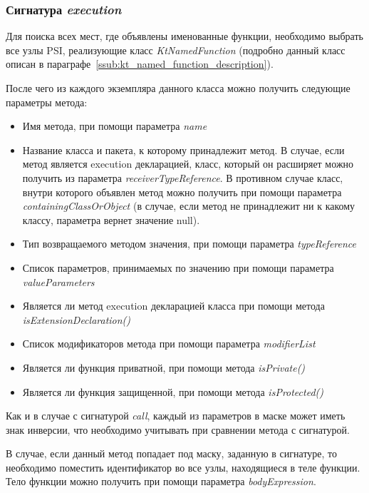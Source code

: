 \subsubsection{Сигнатура \textit{execution}}
\label{ssub:execution_signature}
Для поиска всех мест, где объявлены именованные функции, необходимо выбрать все
узлы PSI, реализующие класс \textit{KtNamedFunction} (подробно данный класс
описан в параграфе~\ref{ssub:kt_named_function_description}).

После чего из каждого экземпляра данного класса можно получить следующие параметры метода:
\begin{itemize}
	\item Имя метода, при помощи параметра \textit{name}
	\item Название класса и пакета, к которому принадлежит метод.
				В случае, если метод является execution декларацией, класс, который он
				расширяет можно получить из параметра \textit{receiverTypeReference}.
				В противном случае класс, внутри которого объявлен метод можно получить
				при	помощи параметра \textit{containingClassOrObject} (в случае, если
				метод не принадлежит ни к какому классу, параметра вернет значение null).
	\item Тип возвращаемого методом значения, при помощи параметра
				\textit{typeReference}
	\item Список параметров, принимаемых по значению при помощи параметра
				\textit{valueParameters}
	\item Является ли метод execution декларацией класса при помощи метода
				\textit{isExtensionDeclaration()}
	\item Список модификаторов метода при помощи параметра \textit{modifierList}
	\item Является ли функция приватной, при помощи метода \textit{isPrivate()}
	\item Является ли функция защищенной, при помощи метода \textit{isProtected()}
\end{itemize}

Как и в случае с сигнатурой \textit{call}, каждый из параметров в маске может
иметь знак инверсии, что необходимо учитывать при сравнении метода с сигнатурой.

В случае, если данный метод попадает под маску, заданную в сигнатуре, то
необходимо поместить идентификатор во все узлы, находящиеся в теле функции.
Тело функции можно получить при помощи параметра \textit{bodyExpression}.
